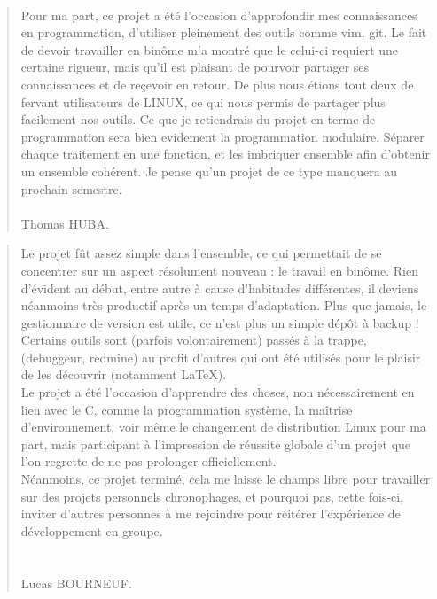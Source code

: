 \documentclass{report}
\begin{document}
    \paragraph*{} %
    \begin{quotation}
        Pour ma part, ce projet a été l'occasion d'approfondir mes connaissances en programmation, d'utiliser pleinement des outils comme vim, git. 
        Le fait de devoir travailler en binôme m'a montré que le celui-ci requiert une certaine rigueur, mais qu'il est plaisant de pourvoir partager ses connaissances et de reçevoir en retour. De plus nous étions tout deux de fervant utilisateurs de LINUX, ce qui nous permis de partager plus facilement nos outils. 
        Ce que je retiendrais du projet en terme de programmation sera bien evidement la programmation modulaire. Séparer chaque traitement en une fonction, et les imbriquer ensemble afin d'obtenir un ensemble cohérent. Je pense qu'un projet de ce type manquera au prochain semestre. \\ \\
        Thomas HUBA.
    \end{quotation}
    \vspace{2cm}
    \begin{quotation}
            Le projet fût assez simple dans l'ensemble, ce qui permettait de se concentrer sur un aspect résolument nouveau : le travail en binôme. Rien d'évident au début, 
            entre autre à cause d'habitudes différentes, il deviens néanmoins très productif après un temps d'adaptation. 
            Plus que jamais, le gestionnaire de version est utile, ce n'est plus un simple dépôt à backup ! \\
            Certains outils sont (parfois volontairement) passés à la trappe, (debuggeur, redmine) au profit d'autres qui ont été utilisés pour le plaisir de les découvrir 
                (notamment \LaTeX). \\
            Le projet a été l'occasion d'apprendre des choses, non nécessairement en lien avec le C, comme la programmation système, la maîtrise d'environnement, 
            voir même le changement de distribution Linux pour ma part, mais participant à l'impression de réussite globale d'un projet que l'on regrette 
                de ne pas prolonger officiellement. \\
            Néanmoins, ce projet terminé, cela me laisse le champs libre pour travailler sur des projets personnels chronophages, et pourquoi pas, cette fois-ci, 
                inviter d'autres personnes à me rejoindre pour réitérer l'expérience de développement en groupe. \\
            \\ \\
        Lucas BOURNEUF.
    \end{quotation}
\end{document}
